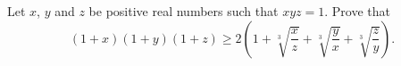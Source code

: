 Let $x$,  $y$ and $z$ be positive real numbers such that $xyz = 1$. Prove that$$\left(1+x\right)\left(1+y\right)\left(1+z\right)\geq 2\left(1+\sqrt[3]{\frac{x}{z}}+\sqrt[3]{\frac{y}{x}}+\sqrt[3]{\frac{z}{y}}\right).$$